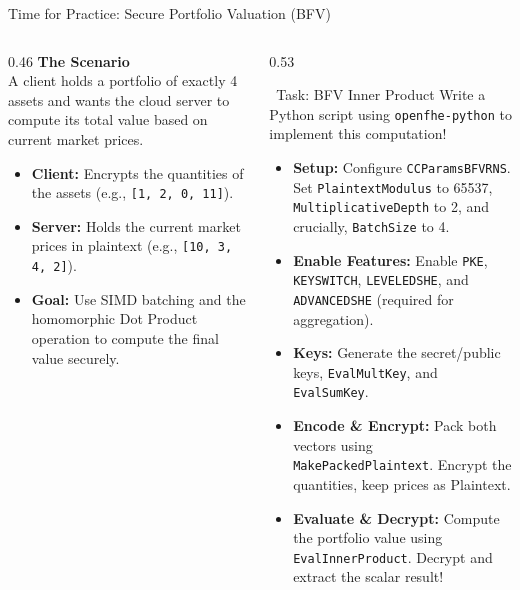 \documentclass[aspectratio=169, 10pt]{beamer}
\begin{document}
\begin{frame}{Time for Practice: Secure Portfolio Valuation (BFV)}
\begin{columns}[T]
\begin{column}{0.46\textwidth}
\vspace{0.1cm}
\textbf{\large The Scenario} \\
\vspace{0.2cm}
\small
A client holds a portfolio of exactly 4 assets and wants the cloud server to compute its total value based on current market prices.
\vspace{0.2cm}
\begin{itemize}
\setlength{\itemsep}{0.1cm}
\item \textbf{Client:} Encrypts the quantities of the assets (e.g., \texttt{[1, 2, 0, 11]}).
\item \textbf{Server:} Holds the current market prices in plaintext (e.g., \texttt{[10, 3, 4, 2]}).
\item \textbf{Goal:} Use SIMD batching and the homomorphic Dot Product operation to compute the final value securely.
\end{itemize}
\end{column}

\begin{column}{0.53\textwidth}
\begin{block}{\faKeyboard \ Task: BFV Inner Product}
\footnotesize
Write a Python script using \texttt{openfhe-python} to implement this computation!
\begin{itemize}
\setlength{\itemsep}{0.05cm}
\item[\textbf{1.}] \textbf{Setup:} Configure \texttt{CCParamsBFVRNS}. Set \texttt{PlaintextModulus} to 65537, \texttt{MultiplicativeDepth} to 2, and crucially, \texttt{BatchSize} to 4.
\item[\textbf{2.}] \textbf{Enable Features:} Enable \texttt{PKE}, \texttt{KEYSWITCH}, \texttt{LEVELEDSHE}, and \texttt{ADVANCEDSHE} (required for aggregation).
\item[\textbf{3.}] \textbf{Keys:} Generate the secret/public keys, \texttt{EvalMultKey}, and \texttt{EvalSumKey}.
\item[\textbf{4.}] \textbf{Encode \& Encrypt:} Pack both vectors using \texttt{MakePackedPlaintext}. Encrypt the quantities, keep prices as Plaintext.
\item[\textbf{5.}] \textbf{Evaluate \& Decrypt:} Compute the portfolio value using \texttt{EvalInnerProduct}. Decrypt and extract the scalar result!
\end{itemize}
\end{block}
\end{column}
\end{columns}
\end{frame}
\end{document}
